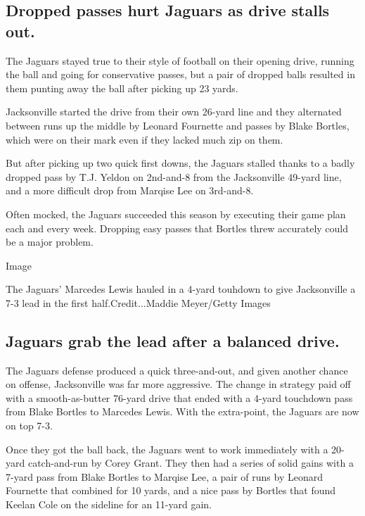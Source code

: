 \hypertarget{dropped-passes-hurt-jaguars-as-drive-stalls-out}{%
\subsection{Dropped passes hurt Jaguars as drive stalls
out.}\label{dropped-passes-hurt-jaguars-as-drive-stalls-out}}

The Jaguars stayed true to their style of football on their opening
drive, running the ball and going for conservative passes, but a pair of
dropped balls resulted in them punting away the ball after picking up 23
yards.

Jacksonville started the drive from their own 26-yard line and they
alternated between runs up the middle by Leonard Fournette and passes by
Blake Bortles, which were on their mark even if they lacked much zip on
them.

But after picking up two quick first downs, the Jaguars stalled thanks
to a badly dropped pass by T.J. Yeldon on 2nd-and-8 from the
Jacksonville 49-yard line, and a more difficult drop from Marqise Lee on
3rd-and-8.

Often mocked, the Jaguars succeeded this season by executing their game
plan each and every week. Dropping easy passes that Bortles threw
accurately could be a major problem.

Image

The Jaguars' Marcedes Lewis hauled in a 4-yard touhdown to give
Jacksonville a 7-3 lead in the first half.Credit...Maddie Meyer/Getty
Images

\hypertarget{jaguars-grab-the-lead-after-a-balanced-drive}{%
\subsection{Jaguars grab the lead after a balanced
drive.}\label{jaguars-grab-the-lead-after-a-balanced-drive}}

The Jaguars defense produced a quick three-and-out, and given another
chance on offense, Jacksonville was far more aggressive. The change in
strategy paid off with a smooth-as-butter 76-yard drive that ended with
a 4-yard touchdown pass from Blake Bortles to Marcedes Lewis. With the
extra-point, the Jaguars are now on top 7-3.

Once they got the ball back, the Jaguars went to work immediately with a
20-yard catch-and-run by Corey Grant. They then had a series of solid
gains with a 7-yard pass from Blake Bortles to Marqise Lee, a pair of
runs by Leonard Fournette that combined for 10 yards, and a nice pass by
Bortles that found Keelan Cole on the sideline for an 11-yard gain.

